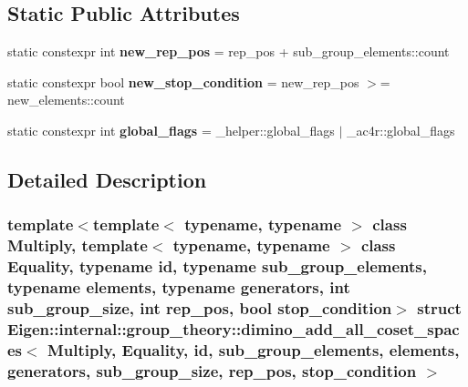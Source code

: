 \subsection*{Static Public Attributes}
\begin{DoxyCompactItemize}
\item 
\mbox{\label{struct_eigen_1_1internal_1_1group__theory_1_1dimino__add__all__coset__spaces_a7cdd8d982960b3620260585bc6bfede9}} 
static constexpr int {\bfseries new\+\_\+rep\+\_\+pos} = rep\+\_\+pos + sub\+\_\+group\+\_\+elements\+::count
\item 
\mbox{\label{struct_eigen_1_1internal_1_1group__theory_1_1dimino__add__all__coset__spaces_ac9138f2040c6dc15e6446d41e4696c67}} 
static constexpr bool {\bfseries new\+\_\+stop\+\_\+condition} = new\+\_\+rep\+\_\+pos $>$= new\+\_\+elements\+::count
\item 
\mbox{\label{struct_eigen_1_1internal_1_1group__theory_1_1dimino__add__all__coset__spaces_aca50a3a0f84541dba3377803cf404e47}} 
static constexpr int {\bfseries global\+\_\+flags} = \+\_\+helper\+::global\+\_\+flags $\vert$ \+\_\+ac4r\+::global\+\_\+flags
\end{DoxyCompactItemize}


\subsection{Detailed Description}
\subsubsection*{template$<$template$<$ typename, typename $>$ class Multiply, template$<$ typename, typename $>$ class Equality, typename id, typename sub\+\_\+group\+\_\+elements, typename elements, typename generators, int sub\+\_\+group\+\_\+size, int rep\+\_\+pos, bool stop\+\_\+condition$>$\newline
struct Eigen\+::internal\+::group\+\_\+theory\+::dimino\+\_\+add\+\_\+all\+\_\+coset\+\_\+spaces$<$ Multiply, Equality, id, sub\+\_\+group\+\_\+elements, elements, generators, sub\+\_\+group\+\_\+size, rep\+\_\+pos, stop\+\_\+condition $>$}



